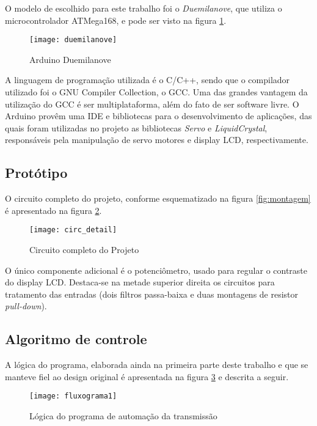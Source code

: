 \documentclass[a4paper,11pt]{article}
\begin{document}
O modelo de escolhido para este trabalho foi o \textit{Duemilanove}, que
utiliza o microcontrolador ATMega168, e pode ser visto na figura
\ref{fig:duemilanove}.
\begin{figure}[h]
\begin{center}
 \texttt{[image: duemilanove]}
\end{center}
  \caption{Arduino Duemilanove}
  \label{fig:duemilanove}
\end{figure}

A linguagem de programação utilizada é o C/C++, sendo que o compilador
utilizado foi o GNU Compiler Collection, o GCC\cite{gcc}. Uma das grandes
vantagem da utilização do GCC é ser multiplataforma, além do fato de ser
software livre. O Arduino provêm uma IDE e bibliotecas para o desenvolvimento
de aplicações, das quais foram utilizadas no projeto as bibliotecas
\textit{Servo} e \textit{LiquidCrystal}, responsáveis pela manipulação de servo
motores e display LCD, respectivamente.

%
\subsection{Protótipo}
\label{sec:prototipo}
O circuito completo do projeto, conforme esquematizado na figura
\ref{fig:montagem} é apresentado na figura \ref{fig:circuito}.
\begin{figure}[h]
\begin{center}
 \texttt{[image: circ\_detail]}
\end{center}
  \caption{Circuito completo do Projeto}
  \label{fig:circuito}
\end{figure}
O único componente adicional é o potenciômetro, usado para regular o contraste
do display LCD. Destaca-se na metade superior direita os circuitos para
tratamento das entradas (dois filtros passa-baixa e duas montagens de resistor
\textit{pull-down}).

%

\subsection{Algoritmo de controle}
\label{sec:software}
A lógica do programa, elaborada ainda na primeira parte deste trabalho e que se
manteve fiel ao design original é apresentada na figura \ref{fig:fluxograma1} e
descrita a seguir.

\begin{figure}[hb!]
 \begin{center}
  \texttt{[image: fluxograma1]}
 \end{center}
 \caption{Lógica do programa de automação da transmissão}
 \label{fig:fluxograma1}
\end{figure}
\end{document}
